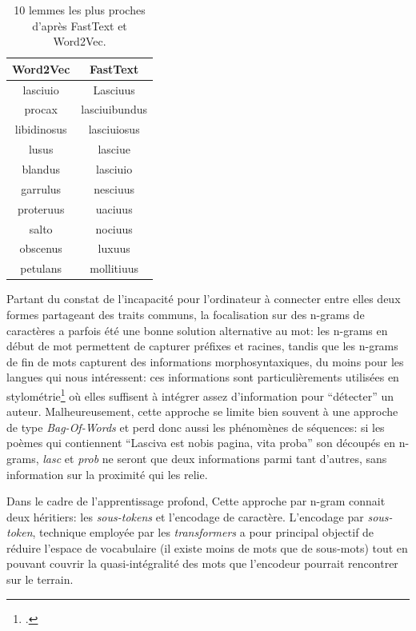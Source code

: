 \begin{table}[ht]
    \centering
    \begin{tabular}{c|c}
        Word2Vec    &  FastText      \\ \hline
        lasciuio    &  Lasciuus      \\
        procax      &  lasciuibundus \\
        libidinosus &  lasciuiosus   \\
        lusus       &  lasciue       \\
        blandus     &  lasciuio      \\
        garrulus    &  nesciuus      \\
        proteruus   &  uaciuus       \\
        salto       &  nociuus       \\
        obscenus    &  luxuus        \\
        petulans    &  mollitiuus    \\
    \end{tabular}
    \caption{10 lemmes les plus proches d'après FastText et Word2Vec.}
    \label{tab:fasttext:lemmes}
\end{table}


Partant du constat de l'incapacité pour l'ordinateur à connecter entre elles deux formes partageant des traits communs, la focalisation sur des n-grams de caractères a parfois été une bonne solution alternative au mot: les n-grams en début de mot permettent de capturer préfixes et racines, tandis que les n-grams de fin de mots capturent des informations morphosyntaxiques, du moins pour les langues qui nous intéressent: ces informations sont particulièrements utilisées en stylométrie\footcite{kestemont_authenticating_2016, camps_stylometry_2020} où elles suffisent à intégrer assez d'information pour \enquote{détecter} un auteur. Malheureusement, cette approche se limite bien souvent à une approche de type \textit{Bag-Of-Words} et perd donc aussi les phénomènes de séquences: si les poèmes qui contiennent \enquote{Lasciva est nobis pagina, vita proba} son découpés en n-grams, \textit{lasc} et \textit{prob} ne seront que deux informations parmi tant d'autres, sans information sur la proximité qui les relie.

Dans le cadre de l'apprentissage profond, Cette approche par n-gram connait deux héritiers: les \textit{sous-tokens} et l'encodage de caractère. L'encodage par \textit{sous-token}, technique employée par les \textit{transformers} a pour principal objectif de réduire l'espace de vocabulaire (il existe moins de mots que de sous-mots) tout en pouvant couvrir la quasi-intégralité des mots que l'encodeur pourrait rencontrer sur le terrain. %

